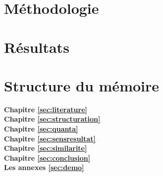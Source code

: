 \section{Méthodologie}
\label{sec:intro:methodologie}


\section{Résultats}
\label{sec:intro:résultats}

\section{Structure du mémoire}
\label{sec:intro:organisation}

\textbf{Chapitre \ref{sec:literature}} \\[0.2em]

\textbf{Chapitre \ref{sec:structuration}} \\[0.2em]

\textbf{Chapitre \ref{sec:quanta}} \\[0.2em]

\textbf{Chapitre \ref{sec:sensresultat}} \\[0.2em]

\textbf{Chapitre \ref{sec:similarite}} \\[0.2em]

\textbf{Chapitre \ref{sec:conclusion}} \\[0.2em]

\textbf{Les annexes \ref{sec:demo}} \\[0.2em]
